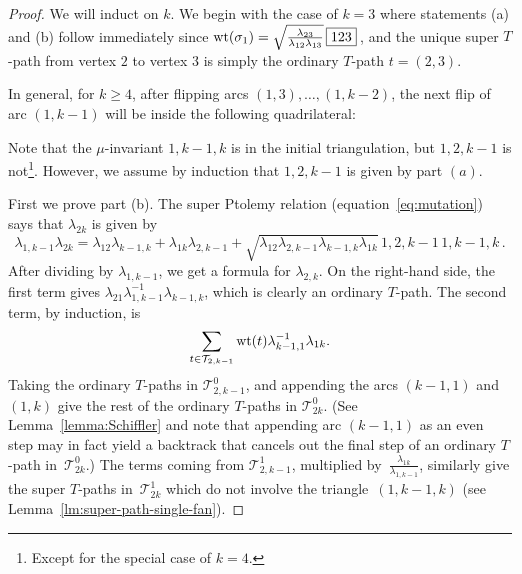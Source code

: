 \begin{proof}
 We will induct on $k$. We begin with the case of $k=3$ where statements (a) and (b) follow immediately since
 ${\rm wt}(\sigma_1) = \sqrt{\frac{\lambda_{23}}{\lambda_{12}\lambda_{13}}} \, \boxed{123}$\,, and the unique super $T$-path from vertex $2$ to vertex $3$
 is simply the ordinary $T$-path $t = (2,3)$.

 In general, for $k\geq 4$, after flipping arcs $(1,3),\dots,(1,k-2)$, the next flip of arc $(1,k-1)$ will be inside the following quadrilateral:
 \begin{center}
 \end{center}
 Note that the $\mu$-invariant $\boxed{1,k-1,k}$ is in the initial triangulation, but $\boxed{1,2,k-1}$ is not\footnote{Except for the special case of $k=4$.}.
 However, we assume by induction that $\boxed{1,2,k-1}$ is given by part $(a)$.

 First we prove part (b).
 The super Ptolemy relation (equation~\eqref{eq:mutation}) says that $\lambda_{2k}$ is given by
 \[
 \lambda_{1,k-1}\lambda_{2k} = \lambda_{12}\lambda_{k-1,k} + \lambda_{1k}\lambda_{2,k-1}
 + \sqrt{\lambda_{12}\lambda_{2,k-1}\lambda_{k-1,k}\lambda_{1k}} \, \boxed{1,2,k-1} \, \boxed{1,k-1,k}\,.
 \]
 After dividing by $\lambda_{1,k-1}$, we get a formula for $\lambda_{2,k}$. On the right-hand side, the first term gives
 $\lambda_{21}\lambda_{1,k-1}^{-1}\lambda_{k-1,k}$, which is clearly an ordinary $T$-path. The second term, by induction, is
 \[ \sum_{t \in \mathcal{T}_{2,k-1}} {\rm wt}(t) \lambda_{k-1,1}^{-1} \lambda_{1k}. \]
 Taking the ordinary $T$-paths in $\mathcal{T}^0_{2,k-1}$, and appending the arcs $(k-1,1)$ and $(1,k)$ give the rest of the ordinary $T$-paths
 in $\mathcal{T}^0_{2k}$. (See Lemma~\ref{lemma:Schiffler} and note that appending arc $(k-1,1)$ as an even step may in fact yield a backtrack that cancels out the final step of an ordinary $T$-path in~$\mathcal{T}^0_{2k}$.) The terms coming from $\mathcal{T}^1_{2,k-1}$, multiplied by~$\frac{\lambda_{1k}}{\lambda_{1,k-1}}$, similarly give the super $T$-paths
 in~$\mathcal{T}^1_{2k}$ which do not involve the triangle~$(1,k-1,k)$ (see Lemma~\ref{lm:super-path-single-fan}).


\end{proof}
